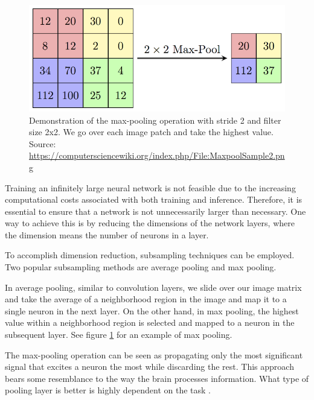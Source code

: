 \begin{figure}[!h]
    \centering
    \includegraphics[width=1\textwidth]{figures/MaxpoolSample2.png}
    \caption{Demonstration of the max-pooling operation with stride 2 and filter
size 2x2. We go over each image patch and take the highest value. Source:
\url{https://computersciencewiki.org/index.php/File:MaxpoolSample2.png}}
    \label{fig:subsampling}
\end{figure}

Training an infinitely large neural network is not feasible due to the increasing computational costs associated with both training and inference.
Therefore, it is essential to ensure that a network is not unnecessarily larger than necessary.
One way to achieve this is by reducing the dimensions of the network layers, where the dimension means the number of neurons in a layer.

To accomplish dimension reduction, subsampling techniques can be employed. Two popular subsampling methods are average pooling and max pooling.

In average pooling, similar to convolution layers, we slide over our image matrix and take the average of a neighborhood region in the image and map it to a single neuron in the next layer.
On the other hand, in max pooling, the highest value within a neighborhood region is selected and mapped to a neuron in the subsequent layer.
See figure \ref{fig:subsampling} for an example of max pooling.

The max-pooling operation can be seen as propagating only the most significant signal that excites a neuron the most while discarding the rest. This approach bears some resemblance to the way the brain processes information.
What type of pooling layer is better is highly dependent on the task \citep{app12178643}.

